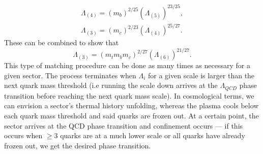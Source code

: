 \documentclass[nofootinbib,twocolumn,preprintnumbers]{revtex4-1}
\begin{document}
\begin{equation}
\begin{split}
\Lambda_{(4)} = (m_b)^{2/25}(\Lambda_{(5)})^{23/25},
\\
\Lambda_{(3)} = (m_c)^{2/23}(\Lambda_{(4)})^{25/27}.
\end{split}
\end{equation}
These can be combined to show that
\begin{equation}
\Lambda_{(3)} = (m_t m_b m_c)^{2/27}(\Lambda_{(6)})^{21/27}.
\end{equation}
This type of matching procedure can be done as many times as necessary for a given sector. The process terminates when $\Lambda_i$ for a given scale is larger than the next quark mass threshold (i.e running the scale down arrives at the $\Lambda_{QCD}$ phase transition before reaching the next quark mass scale).
In cosmological terms, we can envision a sector's thermal history unfolding, whereas the plasma cools below each quark mass threshold and said quarks are frozen out. At a certain point, the sector arrives at the QCD phase transition and confinement occurs --- if this occurs when $\geq 3$ quarks are at a much lower scale or all quarks have already frozen out, we get the desired phase transition.   
\end{document}
